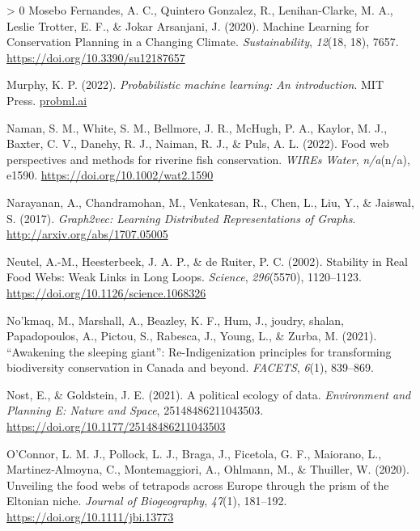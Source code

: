 \documentclass[10pt,oneside]{article}
\newlength{\cslhangindent}
\newenvironment{CSLReferences}[3] %
 {%
  \setlength{\parindent}{0pt}
  \ifodd #1 \everypar{\setlength{\hangindent}{\cslhangindent}}\ignorespaces\fi
  \ifnum #2 > 0
  \setlength{\parskip}{#2\baselineskip}
  \fi
 }%
 {}
\begin{document}
\begin{CSLReferences}{1}{0}
\leavevmode\hypertarget{ref-MoseboFernandes2020MacLea}{}%
Mosebo Fernandes, A. C., Quintero Gonzalez, R., Lenihan-Clarke, M. A.,
Leslie Trotter, E. F., \& Jokar Arsanjani, J. (2020). Machine Learning
for Conservation Planning in a Changing Climate. \emph{Sustainability},
\emph{12}(18, 18), 7657. \url{https://doi.org/10.3390/su12187657}

\leavevmode\hypertarget{ref-Murphy2022ProMac}{}%
Murphy, K. P. (2022). \emph{Probabilistic machine learning: An
introduction}. MIT Press. \href{https://probml.ai}{probml.ai}

\leavevmode\hypertarget{ref-Naman2022FooWeb}{}%
Naman, S. M., White, S. M., Bellmore, J. R., McHugh, P. A., Kaylor, M.
J., Baxter, C. V., Danehy, R. J., Naiman, R. J., \& Puls, A. L. (2022).
Food web perspectives and methods for riverine fish conservation.
\emph{WIREs Water}, \emph{n/a}(n/a), e1590.
\url{https://doi.org/10.1002/wat2.1590}

\leavevmode\hypertarget{ref-Narayanan2017GraLea}{}%
Narayanan, A., Chandramohan, M., Venkatesan, R., Chen, L., Liu, Y., \&
Jaiswal, S. (2017). \emph{Graph2vec: Learning Distributed
Representations of Graphs}. \url{http://arxiv.org/abs/1707.05005}

\leavevmode\hypertarget{ref-Neutel2002StaRea}{}%
Neutel, A.-M., Heesterbeek, J. A. P., \& de Ruiter, P. C. (2002).
Stability in Real Food Webs: Weak Links in Long Loops. \emph{Science},
\emph{296}(5570), 1120--1123.
\url{https://doi.org/10.1126/science.1068326}

\leavevmode\hypertarget{ref-Nokmaq2021AwaSle}{}%
No'kmaq, M., Marshall, A., Beazley, K. F., Hum, J., joudry, shalan,
Papadopoulos, A., Pictou, S., Rabesca, J., Young, L., \& Zurba, M.
(2021). {``Awakening the sleeping giant''}: Re-Indigenization principles
for transforming biodiversity conservation in Canada and beyond.
\emph{FACETS}, \emph{6}(1), 839--869.

\leavevmode\hypertarget{ref-Nost2021PolEco}{}%
Nost, E., \& Goldstein, J. E. (2021). A political ecology of data.
\emph{Environment and Planning E: Nature and Space}, 25148486211043503.
\url{https://doi.org/10.1177/25148486211043503}

\leavevmode\hypertarget{ref-OConnor2020UnvFoo}{}%
O'Connor, L. M. J., Pollock, L. J., Braga, J., Ficetola, G. F.,
Maiorano, L., Martinez‐Almoyna, C., Montemaggiori, A., Ohlmann, M., \&
Thuiller, W. (2020). Unveiling the food webs of tetrapods across Europe
through the prism of the Eltonian niche. \emph{Journal of Biogeography},
\emph{47}(1), 181--192. \url{https://doi.org/10.1111/jbi.13773}


\end{CSLReferences}
\end{document}
